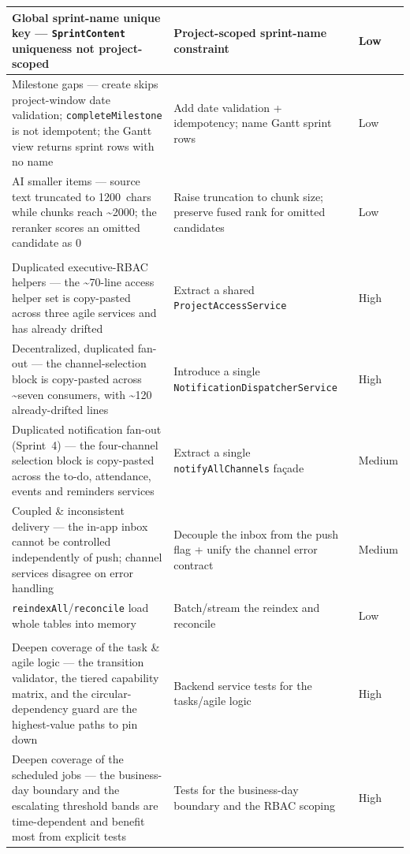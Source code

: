 \begin{longtable}{@{}>{\raggedright\arraybackslash}p{6.3cm}>{\raggedright\arraybackslash}p{6.5cm}>{\raggedright\arraybackslash}p{1.4cm}@{}}
\midrule
Global sprint-name unique key --- \texttt{SprintContent} uniqueness not project-scoped & Project-scoped sprint-name constraint & Low \\
\midrule
Milestone gaps --- create skips project-window date validation; \texttt{completeMilestone} is not idempotent; the Gantt view returns sprint rows with no name & Add date validation + idempotency; name Gantt sprint rows & Low \\
\midrule
AI smaller items --- source text truncated to 1200~chars while chunks reach \textasciitilde2000; the reranker scores an omitted candidate as 0 & Raise truncation to chunk size; preserve fused rank for omitted candidates & Low \\
\midrule
\multicolumn{3}{@{}l}{\textbf{Maintainability}} \\*
\addlinespace[2pt]
Duplicated executive-RBAC helpers --- the \textasciitilde70-line access helper set is copy-pasted across three agile services and has already drifted & Extract a shared \texttt{ProjectAccessService} & High \\
\midrule
Decentralized, duplicated fan-out --- the channel-selection block is copy-pasted across \textasciitilde seven consumers, with \textasciitilde120 already-drifted lines & Introduce a single \texttt{NotificationDispatcherService} & High \\
\midrule
Duplicated notification fan-out (Sprint~4) --- the four-channel selection block is copy-pasted across the to-do, attendance, events and reminders services & Extract a single \texttt{notifyAllChannels} façade & Medium \\
\midrule
Coupled \& inconsistent delivery --- the in-app inbox cannot be controlled independently of push; channel services disagree on error handling & Decouple the inbox from the push flag + unify the channel error contract & Medium \\
\midrule
\texttt{reindexAll}/\texttt{reconcile} load whole tables into memory & Batch/stream the reindex and reconcile & Low \\
\midrule
\multicolumn{3}{@{}l}{\textbf{Testing}} \\*
\addlinespace[2pt]
Deepen coverage of the task \& agile logic --- the transition validator, the tiered capability matrix, and the circular-dependency guard are the highest-value paths to pin down & Backend service tests for the tasks/agile logic & High \\
\midrule
Deepen coverage of the scheduled jobs --- the business-day boundary and the escalating threshold bands are time-dependent and benefit most from explicit tests & Tests for the business-day boundary and the RBAC scoping & High \\

\end{longtable}
